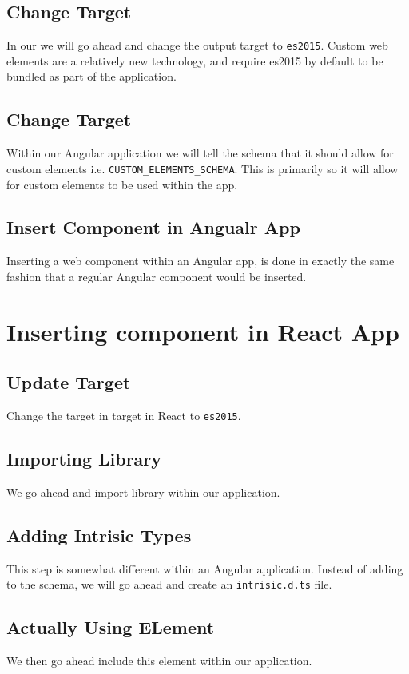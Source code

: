 \subsection{Change Target}
In our  we will go ahead and change the output target to \lstinline{es2015}. Custom web elements are a relatively new technology, and require es2015 by default to be bundled as part of the application. 

\subsection{Change Target}
Within our Angular application we will tell the schema that it should allow for custom elements i.e. \lstinline{CUSTOM_ELEMENTS_SCHEMA}. This is primarily so it will allow for custom elements to be used within the app. 

\subsection{Insert Component in Angualr App}
Inserting a web component within an Angular app, is done in exactly the same fashion that a regular Angular component would be inserted. 

\section{Inserting component in React App}

\subsection{Update Target}
Change the target in target in React to \lstinline{es2015}.

\subsection{Importing Library}
We go ahead and import library within our application. 

\subsection{Adding Intrisic Types}                                              
This step is somewhat different within an Angular application. Instead of adding to the schema, we will go ahead and create an \lstinline{intrisic.d.ts} file. 

\subsection{Actually Using ELement}
We then go ahead include this element within our application. 